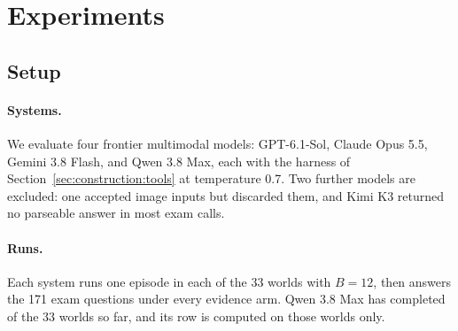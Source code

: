 \section{Experiments}
\label{sec:experiments}

\subsection{Setup}

\paragraph{Systems.} We evaluate four frontier multimodal models: GPT-6.1-Sol, Claude Opus 5.5, Gemini 3.8 Flash, and Qwen 3.8 Max, each with the harness of Section~\ref{sec:construction:tools} at temperature 0.7. Two further models are excluded: one accepted image inputs but discarded them, and Kimi K3 returned no parseable answer in most exam calls. 

\paragraph{Runs.} Each system runs one episode in each of the 33 worlds with $B=12$, then answers the 171 exam questions under every evidence arm. Qwen 3.8 Max has completed  of the 33 worlds so far, and its row is computed on those worlds only. 

